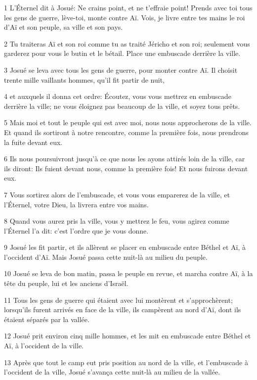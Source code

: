 \par 1 L'Éternel dit à Josué: Ne crains point, et ne t'effraie point! Prends avec toi tous les gens de guerre, lève-toi, monte contre Aï. Vois, je livre entre tes mains le roi d'Aï et son peuple, sa ville et son pays.
\par 2 Tu traiteras Aï et son roi comme tu as traité Jéricho et son roi; seulement vous garderez pour vous le butin et le bétail. Place une embuscade derrière la ville.
\par 3 Josué se leva avec tous les gens de guerre, pour monter contre Aï. Il choisit trente mille vaillants hommes, qu'il fit partir de nuit,
\par 4 et auxquels il donna cet ordre: Écoutez, vous vous mettrez en embuscade derrière la ville; ne vous éloignez pas beaucoup de la ville, et soyez tous prêts.
\par 5 Mais moi et tout le peuple qui est avec moi, nous nous approcherons de la ville. Et quand ils sortiront à notre rencontre, comme la première fois, nous prendrons la fuite devant eux.
\par 6 Ils nous poursuivront jusqu'à ce que nous les ayons attirés loin de la ville, car ils diront: Ils fuient devant nous, comme la première fois! Et nous fuirons devant eux.
\par 7 Vous sortirez alors de l'embuscade, et vous vous emparerez de la ville, et l'Éternel, votre Dieu, la livrera entre vos mains.
\par 8 Quand vous aurez pris la ville, vous y mettrez le feu, vous agirez comme l'Éternel l'a dit: c'est l'ordre que je vous donne.
\par 9 Josué les fit partir, et ils allèrent se placer en embuscade entre Béthel et Aï, à l'occident d'Aï. Mais Josué passa cette nuit-là au milieu du peuple.
\par 10 Josué se leva de bon matin, passa le peuple en revue, et marcha contre Aï, à la tête du peuple, lui et les anciens d'Israël.
\par 11 Tous les gens de guerre qui étaient avec lui montèrent et s'approchèrent; lorsqu'ils furent arrivés en face de la ville, ils campèrent au nord d'Aï, dont ils étaient séparés par la vallée.
\par 12 Josué prit environ cinq mille hommes, et les mit en embuscade entre Béthel et Aï, à l'occident de la ville.
\par 13 Après que tout le camp eut pris position au nord de la ville, et l'embuscade à l'occident de la ville, Josué s'avança cette nuit-là au milieu de la vallée.
